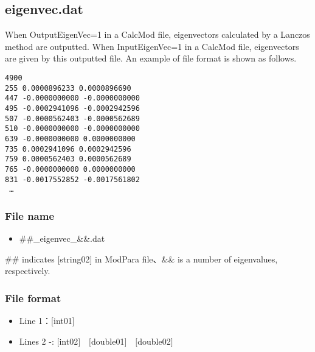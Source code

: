 \newpage
\subsection{eigenvec.dat}
\label{Subsec:eigenvec}
When OutputEigenVec=1 in a CalcMod file, eigenvectors calculated by a Lanczos method are outputted. When InputEigenVec=1 in a CalcMod file, eigenvectors are given by this outputted file. An example of file format is shown as follows.

\begin{minipage}{15cm}
\begin{screen}
\begin{verbatim}
4900 
255 0.0000896233 0.0000896690
447 -0.0000000000 -0.0000000000
495 -0.0002941096 -0.0002942596
507 -0.0000562403 -0.0000562689
510 -0.0000000000 -0.0000000000
639 -0.0000000000 0.0000000000
735 0.0002941096 0.0002942596
759 0.0000562403 0.0000562689
765 -0.0000000000 0.0000000000
831 -0.0017552852 -0.0017561802
 …
\end{verbatim}
\end{screen}
\end{minipage}

\subsubsection{File name}
\begin{itemize}
   \item{\#\#\_eigenvec\_{\&\&}.dat}
\end{itemize}
  \#\# indicates [string02] in ModPara file、\&\& is a number of eigenvalues, respectively.

\subsubsection{File format}
 \begin{itemize}
   \item  Line 1：$[$int01$]$
   \item  Lines 2 -: $[$int02$]$~~$[$double01$]$~~$[$double02$]$
  \end{itemize}
  

